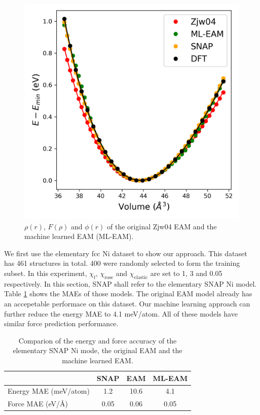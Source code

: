 \documentclass[prb,reprint]{revtex4-2}
\begin{document}
% 
%
\begin{figure}[h!]
\centering
\includegraphics[scale=0.65]{figures/Ni_all_eos.png}
\caption{\label{fig:Ni_eam} $\rho(r)$, $F(\rho)$ and $\phi(r)$ of the original 
Zjw04 EAM and the machine learned EAM (ML-EAM).}
\end{figure}

We first use the elementary fcc Ni dataset to show our approach. This dataset 
has 461 structures in total. 400 were randomly selected to form the training 
subset. In this experiment, $\chi_{\mathrm{f}}$, $\chi_{\mathrm{rose}}$ and 
$\chi_{\mathrm{elastic}}$ are set to 1, 3 and 0.05 respectively. In this 
section, SNAP shall refer to the elementary SNAP Ni model. Table 
\ref{table:elementary_Ni_mae} shows the MAEs of those models. The original EAM 
model already has an accepetable performace on this dataset. Our machine 
learning approach can further reduce the energy MAE to 4.1 meV/atom. All of 
these models have similar force prediction performance.

% 
%
\begin{table}[h]
\centering
\begin{tabular}{lccc}
\hline
    & SNAP & EAM & ML-EAM \\
\hline
Energy MAE (meV/atom) & 1.2 & 10.6 & 4.1 \\
Force MAE (eV/\AA) & 0.05 & 0.06 & 0.05 \\
\hline
\end{tabular}
\caption{\label{table:elementary_Ni_mae} Comparion of the energy and force 
accuracy of the elementary SNAP Ni mode, the original EAM and the machine 
learned EAM.
}
\end{table}
\end{document}
